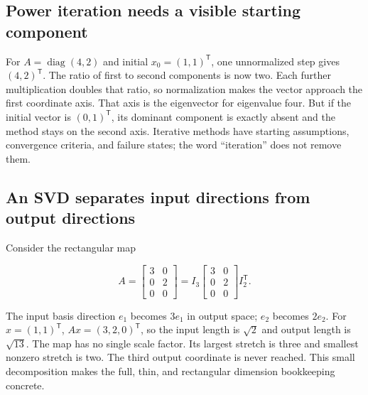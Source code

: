 \subsection{Power iteration needs a visible starting component}\label{02-foundations-ii-ch038-power-iteration-needs-a-visible-starting-component}

\hypertarget{02-foundations-ii-ch038-power-iteration-needs-a-visible-starting-component}{}

For \(A=\operatorname{diag}(4,2)\) and initial \(x_0=(1,1)^\mathsf T\), one unnormalized step gives \((4,2)^\mathsf T\). The ratio of first to second components is now two. Each further multiplication doubles that ratio, so normalization makes the vector approach the first coordinate axis. That axis is the eigenvector for eigenvalue four. But if the initial vector is \((0,1)^\mathsf T\), its dominant component is exactly absent and the method stays on the second axis. Iterative methods have starting assumptions, convergence criteria, and failure states; the word ``iteration'' does not remove them.

\subsection{An SVD separates input directions from output directions}\label{02-foundations-ii-ch038-an-svd-separates-input-directions-from-output-directions}

\hypertarget{02-foundations-ii-ch038-an-svd-separates-input-directions-from-output-directions}{}

Consider the rectangular map

\[
A=\begin{bmatrix}3&0\\0&2\\0&0\end{bmatrix}
=I_3\begin{bmatrix}3&0\\0&2\\0&0\end{bmatrix}I_2^\mathsf T.
\]

The input basis direction \(e_1\) becomes \(3e_1\) in output space; \(e_2\) becomes \(2e_2\). For \(x=(1,1)^\mathsf T\), \(Ax=(3,2,0)^\mathsf T\), so the input length is \(\sqrt2\) and output length is \(\sqrt{13}\). The map has no single scale factor. Its largest stretch is three and smallest nonzero stretch is two. The third output coordinate is never reached. This small decomposition makes the full, thin, and rectangular dimension bookkeeping concrete.

